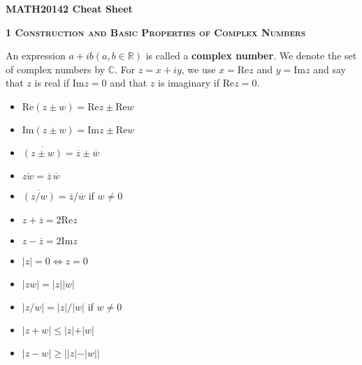 \documentclass[a4paper]{article}
\newcommand*\conj[1]{\overline{#1}}
\newcommand*\abs[1]{\vert #1 \vert}
\begin{document}

\begin{center}
	\huge{\textbf{MATH20142 Cheat Sheet}}\\
\end{center}

\begin{framed}
	\begin{center}
		\textbf{\textsc{1 Construction and Basic Properties of Complex Numbers}}
	\end{center}
	
	\noindent
	An expression $a + ib (a, b \in \mathbb{R})$ is called a \textbf{complex number}. We denote the set of complex numbers by $\mathbb{C}$. For $z = x + iy$, we use $x = \text{Re}z$ and $y = \text{Im}z$ and say that $z$ is real if $\text{Im}z = 0$ and that $z$ is imaginary if $\text{Re}z = 0$.
	
	\begin{multicols}{3}
		\begin{itemize}
			\item $\text{Re}(z \pm w) = \text{Re}z \pm \text{Re}w$
			\item $\text{Im}(z \pm w) = \text{Im}z \pm \text{Re}w$
			\item $\conj{(z \pm w)} = \conj{z} \pm \conj{w}$
			\item $\conj{zw} = \conj{z} \, \conj{w}$
			\item $\conj{(z/w)} = \conj{z}/\conj{w}$ if $w \neq 0$
			\item $z + \conj{z} = 2\text{Re}z$
			\item $z - \conj{z} = 2\text{Im}z$
			\item $ \abs{z} = 0 \iff z = 0$
			\item $ \abs{zw} = \abs{z} \abs{w}$
			\item $ \abs{z / w} = \abs{z} / \abs{w}$ if $w \neq 0$
			\item $\abs{z + w} \leq \abs{z} + \abs{w}$
			\item $\abs{z - w} \geq \abs{\abs{z} - \abs{w}}$
		\end{itemize}
	\end{multicols}
\end{framed}
\end{document}
